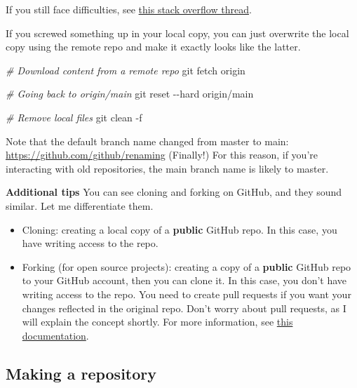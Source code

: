 \documentclass[
]{book}
\newenvironment{Shaded}{\begin{snugshade}}{\end{snugshade}}
\newcommand{\CommentTok}[1]{\textcolor[rgb]{0.56,0.35,0.01}{\textit{#1}}}
\newcommand{\FunctionTok}[1]{\textcolor[rgb]{0.00,0.00,0.00}{#1}}
\newcommand{\NormalTok}[1]{#1}
\begin{document}
If you still face difficulties, see \href{https://stackoverflow.com/questions/13509293/git-fatal-could-not-read-from-remote-repository}{this stack overflow thread}.

If you screwed something up in your local copy, you can just overwrite the local copy using the remote repo and make it exactly looks like the latter.

\begin{Shaded}
\begin{Highlighting}[]
\CommentTok{\# Download content from a remote repo }
\FunctionTok{git}\NormalTok{ fetch origin}

\CommentTok{\# Going back to origin/main}
\FunctionTok{git}\NormalTok{ reset {-}{-}hard origin/main }

\CommentTok{\# Remove local files }
\FunctionTok{git}\NormalTok{ clean {-}f}
\end{Highlighting}
\end{Shaded}

Note that the default branch name changed from master to main: \url{https://github.com/github/renaming} (Finally!) For this reason, if you're interacting with old repositories, the main branch name is likely to master.

\textbf{Additional tips}
You can see cloning and forking on GitHub, and they sound similar. Let me differentiate them.

\begin{itemize}
\item
  Cloning: creating a local copy of a \textbf{public} GitHub repo. In this case, you have writing access to the repo.
\item
  Forking (for open source projects): creating a copy of a \textbf{public} GitHub repo to your GitHub account, then you can clone it. In this case, you don't have writing access to the repo. You need to create pull requests if you want your changes reflected in the original repo. Don't worry about pull requests, as I will explain the concept shortly. For more information, see \href{https://docs.github.com/en/desktop/contributing-and-collaborating-using-github-desktop/cloning-and-forking-repositories-from-github-desktop}{this documentation}.
\end{itemize}

\hypertarget{making-a-repository}{%
\subsection{Making a repository}\label{making-a-repository}}
\end{document}
